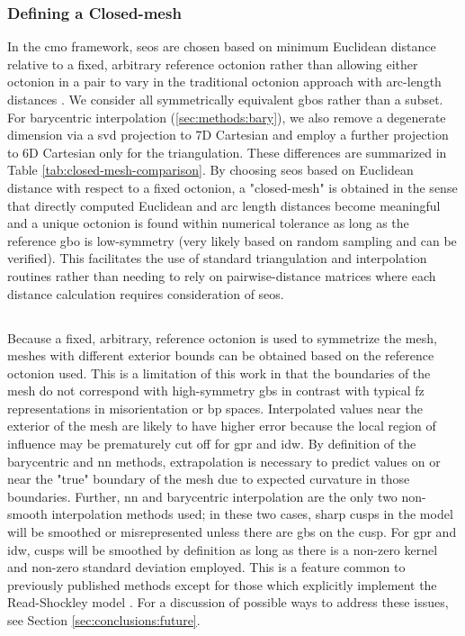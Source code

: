 \documentclass[preprint,12pt]{elsarticle}
\begin{document}
\subsubsection{Defining a Closed-mesh}
In the \gls{cmo} framework, \glspl{seo} are chosen based on minimum Euclidean distance relative to a fixed, arbitrary reference octonion rather than allowing either octonion in a pair to vary in the traditional octonion approach with arc-length distances \cite{francisGeodesicOctonionMetric2019}. We consider all symmetrically equivalent \glspl{gbo} rather than a subset. For barycentric interpolation (\cref{sec:methods:bary}), we also remove a degenerate dimension via a \gls{svd} projection to 7D Cartesian and employ a further projection to 6D Cartesian only for the triangulation. These differences are summarized in Table \cref{tab:closed-mesh-comparison}. By choosing \glspl{seo} based on Euclidean distance with respect to a fixed octonion, a "closed-mesh" is obtained in the sense that directly computed Euclidean and arc length distances become meaningful and a unique octonion is found within numerical tolerance as long as the reference \gls{gbo} is low-symmetry (very likely based on random sampling and can be verified). This facilitates the use of standard triangulation and interpolation routines rather than needing to rely on pairwise-distance matrices where each distance calculation requires consideration of \glspl{seo}.

\subsection{}
Because a fixed, arbitrary, reference octonion is used to symmetrize the mesh, meshes with different exterior bounds can be obtained based on the reference octonion used. This is a limitation of this work in that the boundaries of the mesh do not correspond with high-symmetry \glspl{gb} in contrast with typical \gls{fz} representations in misorientation or \gls{bp} \cite{patalaSymmetriesRepresentationGrain2013,homerGrainBoundaryPlane2015} spaces. Interpolated values near the exterior of the mesh are likely to have higher error because the local region of influence may be prematurely cut off for \gls{gpr} and \gls{idw}. By definition of the barycentric and \gls{nn} methods, extrapolation is necessary to predict values on or near the "true" boundary of the mesh due to expected curvature in those boundaries. Further, \gls{nn} and barycentric interpolation are the only two non-smooth interpolation methods used; in these two cases, sharp cusps in the model will be smoothed or misrepresented unless there are \glspl{gb} on the cusp. For \gls{gpr} and \gls{idw}, cusps will be smoothed by definition as long as there is a non-zero kernel and non-zero standard deviation employed. This is a feature common to previously published methods \cite{liRelativeGrainBoundary2009,shenDeterminingGrainBoundary2019,chesserLearningGrainBoundary2020} except for those \cite{bulatovGrainBoundaryEnergy2014,shekhawatGeneralizedReadShockley2016} which explicitly implement the Read-Shockley model \cite{readDislocationModelsCrystal1950}. For a discussion of possible ways to address these issues, see Section \cref{sec:conclusions:future}.
\end{document}
